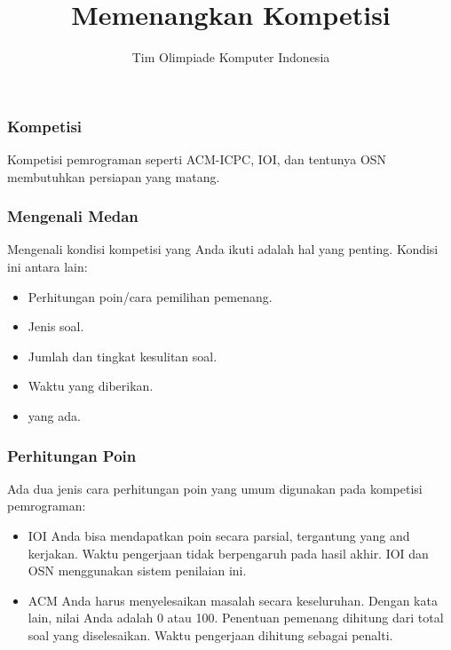  

\title{Memenangkan Kompetisi}
\author{Tim Olimpiade Komputer Indonesia}
\date{}



\begin{frame}
  \titlepage
\end{frame}

  
\begin{frame}
  \frametitle{Kompetisi}
  Kompetisi pemrograman seperti ACM-ICPC, IOI, dan tentunya OSN membutuhkan persiapan yang matang.
\end{frame}

\begin{frame}
  \frametitle{Mengenali Medan}
  Mengenali kondisi kompetisi yang Anda ikuti adalah hal yang penting. Kondisi ini antara lain:
  \begin{itemize}
    \item Perhitungan poin/cara pemilihan pemenang.
    \item Jenis soal.
    \item Jumlah dan tingkat kesulitan soal.
    \item Waktu yang diberikan.
    \item {} yang ada.
  \end{itemize}
\end{frame}


\begin{frame}
  \frametitle{Perhitungan Poin}
  Ada dua jenis cara perhitungan poin yang umum digunakan pada kompetisi pemrograman:
  \begin{itemize}
    \item IOI \newline
     Anda bisa mendapatkan poin secara parsial, tergantung  yang and kerjakan. Waktu pengerjaan tidak berpengaruh pada hasil akhir. IOI dan OSN menggunakan sistem penilaian ini.
    
    \item ACM \newline
    Anda harus menyelesaikan masalah secara keseluruhan. Dengan kata lain, nilai Anda adalah 0 atau 100. Penentuan pemenang dihitung dari total soal yang diselesaikan.  Waktu pengerjaan dihitung sebagai penalti.
  \end{itemize}
\end{frame}

